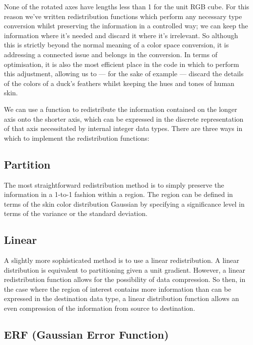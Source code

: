 None of the rotated axes have lengths less than 1 for the unit RGB cube. For this reason we've written redistribution functions which perform any necessary type conversion whilst preserving the information in a controlled way; we can keep the information where it's needed and discard it where it's irrelevant. So although this is strictly beyond the normal meaning of a color space conversion, it is addressing a connected issue and belongs in the conversion. In terms of optimisation, it is also the most efficient place in the code in which to perform this adjustment, allowing us to --- for the sake of example --- discard the details of the colors of a duck's feathers whilst keeping the hues and tones of human skin.

We can use a function to redistribute the information contained on the longer axis onto the shorter axis, which can be expressed in the discrete representation of that axis necessitated by internal integer data types. There are three ways in which to implement the redistribution functions:

\subsection{Partition}\label{sec:Partition}

The most straightforward redistribution method is to simply preserve the information in a 1-to-1 fashion within a region. The region can be defined in terms of the skin color distribution Gaussian by specifying a significance level in terms of the variance or the standard deviation.

\subsection{Linear}\label{sec:Linear}

A slightly more sophisticated method is to use a linear redistribution. A linear distribution is equivalent to partitioning given a unit gradient. However, a linear redistribution function allows for the possibility of data compression. So then, in the case where the region of interest contains more information than can be expressed in the destination data type, a linear distribution function allows an even compression of the information from source to destination. ~\cite{Lee2002}

\subsection{ERF (Gaussian Error Function)}\label{sec:ERF}

